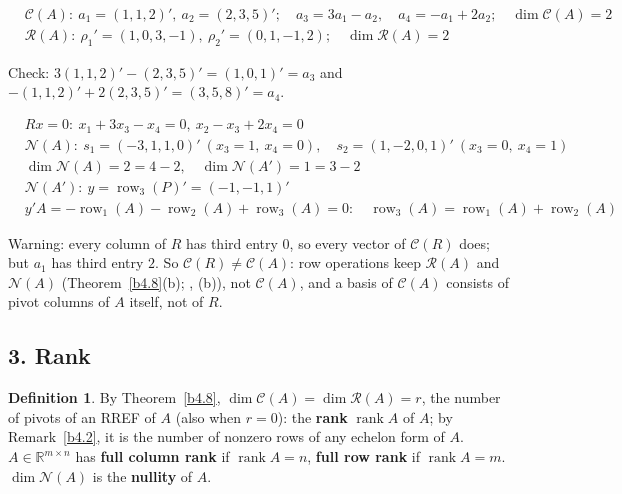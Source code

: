 \documentclass[12pt]{article}
\newcommand{\R}{\mathbb R}
\DeclareMathOperator{\rank}{rank}
\theoremstyle{definition}
\newtheorem{definition}[theorem]{Definition}
\newcommand{\boardtop}{\vspace*{-\abovedisplayskip}}
\DeclareMathOperator{\row}{row}
\begin{document}
\begin{board}
\boardtop
\begin{align*}
&\mathcal C(A):\ a_1=(1,1,2)',\ a_2=(2,3,5)';\quad a_3=3a_1-a_2,\quad a_4=-a_1+2a_2;\quad\dim\mathcal C(A)=2\\
&\mathcal R(A):\ \rho_1'=(1,0,3,-1),\ \rho_2'=(0,1,-1,2);\quad\dim\mathcal R(A)=2
\end{align*}
\end{board}
Check: \(3(1,1,2)'-(2,3,5)'=(1,0,1)'=a_3\) and \(-(1,1,2)'+2(2,3,5)'=(3,5,8)'=a_4\).
\begin{board}
\boardtop
\begin{align*}
&Rx=0:\ x_1+3x_3-x_4=0,\ x_2-x_3+2x_4=0\\
&\mathcal N(A):\ s_1=(-3,1,1,0)'\ (x_3=1,\ x_4=0),\quad s_2=(1,-2,0,1)'\ (x_3=0,\ x_4=1)\\
&\dim\mathcal N(A)=2=4-2,\quad\dim\mathcal N(A')=1=3-2\\
&\mathcal N(A'):\ y=\row_3(P)'=(-1,-1,1)'\\
&y'A=-\row_1(A)-\row_2(A)+\row_3(A)=0:\quad\row_3(A)=\row_1(A)+\row_2(A)
\end{align*}
\end{board}
Warning: every column of \(R\) has third entry \(0\), so every vector of \(\mathcal C(R)\) does; but \(a_1\) has third
entry \(2\). So \(\mathcal C(R)\ne\mathcal C(A)\): row operations keep \(\mathcal R(A)\) and \(\mathcal N(A)\)
(Theorem~\ref{b4.8}(b); , (b)), not \(\mathcal C(A)\), and a basis of \(\mathcal C(A)\) consists of pivot columns of \(A\) itself, not of \(R\).

\subsection*{3. Rank}

\begin{definition}\label{b4.11}
By Theorem~\ref{b4.8}, \(\dim\mathcal C(A)=\dim\mathcal R(A)=r\), the number of pivots of an RREF of \(A\) (also when
\(r=0\)): the \textbf{rank} \(\rank A\) of \(A\); by Remark~\ref{b4.2}, it is the number of nonzero rows of any echelon
form of \(A\). \(A\in\R^{m\times n}\) has \textbf{full column rank} if \(\rank A=n\), \textbf{full row rank} if
\(\rank A=m\). \(\dim\mathcal N(A)\) is the \textbf{nullity} of \(A\).
\end{definition}
\end{document}
